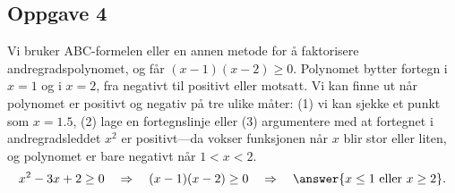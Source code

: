 \subsection*{Oppgave 4}
Vi bruker ABC-formelen eller en annen metode for å faktorisere andregradspolynomet, og får $( x - 1)(x - 2) \geq 0$.
Polynomet bytter fortegn i $x = 1$ og i $x = 2$, fra negativt til positivt eller motsatt.
Vi kan finne ut når polynomet er positivt og negativ på tre ulike måter: (1) vi kan sjekke et punkt som $x = 1.5$, (2) lage en fortegnslinje eller (3) argumentere med at fortegnet i andregradsleddet $x^2$ er positivt---da vokser funksjonen når $x$ blir stor eller liten, og polynomet er bare negativt når $1 < x < 2$.
\begin{equation*}
	x^2 - 3x + 2 \geq 0 
	\quad \Rightarrow \quad ( x - 1)(x - 2) \geq 0
	\quad \Rightarrow \quad \answer{x \leq 1 \text{ eller } x \geq 2}.
\end{equation*}

